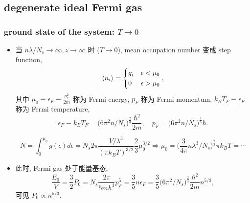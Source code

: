 \subsection{degenerate ideal Fermi gas}
\subsubsection{ground state of the system: $T \rightarrow 0$}
\begin{itemize}
	\item 当 $n \lambda / N_s \rightarrow \infty, z \rightarrow \infty$ 时 ($T \rightarrow 0$), mean occupation number 变成 step function,
	\begin{equation}
		\braket{n_i} = \begin{dcases}
			g_i & \epsilon < \mu_0 \\
			0 & \epsilon > \mu_0
		\end{dcases},
	\end{equation}
	其中 $\mu_0 \equiv \epsilon_F \equiv \frac{p_F^2}{2 m}$ 称为 Fermi energy, $p_F$ 称为 Fermi momentum, $k_B T_F \equiv \epsilon_F$ 称为 Fermi temperature,
	\begin{equation} \label{8.1.7}
		\epsilon_F \equiv k_B T_F = \Big( 6 \pi^2 n / N_s \Big)^{\frac{2}{3}} \frac{\hbar^2}{2 m}, \quad p_F = \Big( 6 \pi^2 n / N_s \Big)^{\frac{1}{3}} \hbar.
	\end{equation}
	
	\begin{tcolorbox}[title=calculation:]
		\begin{equation}
			N = \int_0^{\mu_0} g(\epsilon) d\epsilon = N_s 2 \pi \frac{V / \lambda^3}{(\pi k_B T)^{3 / 2}} \frac{2}{3} \mu_0^{3 / 2} \Longrightarrow \mu_0 = \Big( \frac{3}{4 \pi} n \lambda^3 / N_s \Big)^{\frac{2}{3}} \pi k_B T = \cdots
		\end{equation}
	\end{tcolorbox}
	
	\item 此时, Fermi gas 处于能量基态,
	\begin{equation}
		\frac{E_0}{V} = \frac{3}{2} P_0 = N_s \frac{2 \pi}{5 m h^3} \underline{p_F^5} = \frac{3}{5} n \epsilon_F = \frac{3}{5} \Big( 6 \pi^2 / N_s \Big)^{\frac{2}{3}} \frac{\hbar^2}{2 m} \underline{n^{5 / 3}},
	\end{equation}
	可见 $P_0 \propto n^{5 / 3}$.
\end{itemize}

